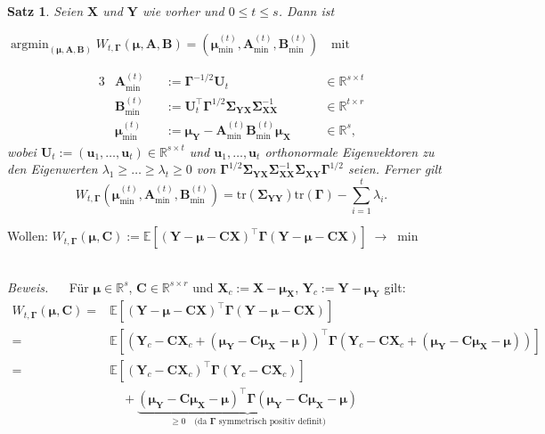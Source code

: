\documentclass[12pt, aspectratio=169]{beamer}
\newcommand{\E}{\mathbb{E}}
\newcommand{\R}{\mathbb{R}}
\newcommand{\X}{\mathbf{X}}
\newcommand{\Y}{\mathbf{Y}}
\newcommand{\muu}{\bm{\mu}}
\newcommand{\Ssigma}{\bm{\Sigma}}
\newcommand{\uu}{\mathbf{u}}
\newcommand{\C}{\mathbf{C}}
\newcommand{\A}{\mathbf{A}}
\newcommand{\B}{\mathbf{B}}
\newcommand{\Ggamma}{\bm{\Gamma}}
\newcommand{\tr}{\mathrm{tr}}
\DeclareMathOperator*{\argmin}{argmin}
\newtheorem{dtheorem}[ddefinition]{Satz}
\begin{document}
\begin{frame}
\begin{dtheorem}
	\label{thm:rrr}
	Seien $\X$ und $\Y$ wie vorher und $0 \leq t \leq s$. Dann ist
	\begin{center}
		$\argmin_{(\muu, \A, \B)} W_{t, \Ggamma}(\muu, \A, \B) = (\muu^{(t)}_{\min}, \A^{(t)}_{\min}, \B^{(t)}_{\min}) \quad  \text{mit}$
	\end{center}
	\begin{alignat*}{3}
	&\A^{(t)}_{\min}   &&:= \Ggamma^{-1/2} \mathbf{U}_t                                       &&\quad \in \R^{s \times t} \\
	&\B^{(t)}_{\min}   &&:= \mathbf{U}_t^\top \Ggamma^{1/2} \Ssigma_{\Y\X}\Ssigma_{\X\X}^{-1} &&\quad \in \R^{t \times r} \\
	&\muu^{(t)}_{\min} &&:= \muu_\Y - \A^{(t)}_{\min} \B^{(t)}_{\min} \muu_\X                 &&\quad \in \R^s \text{,}
	\end{alignat*}
	wobei $\mathbf{U}_t := (\uu_1,\dots, \uu_t) \in \R^{s \times t}$ und $\uu_1,\dots, \uu_t$ orthonormale Eigenvektoren zu den Eigenwerten $\lambda_1 \geq \dots \geq \lambda_t \geq 0$ von $\Ggamma^{1/2} \Ssigma_{\Y\X} \Ssigma_{\X\X}^{-1} \Ssigma_{\X\Y} \Ggamma^{1/2}$ seien.
	Ferner gilt
	$$W_{t, \Ggamma}(\muu^{(t)}_{\min}, \A^{(t)}_{\min}, \B^{(t)}_{\min}) = \tr(\Ssigma_{\Y\Y}) \tr(\Ggamma) - \sum_{i=1}^{t} \lambda_i \text{.}$$
\end{dtheorem}
\end{frame}

\begin{frame}
	\begin{alertblock}{}
		\begin{center}
			Wollen: $ W_{t, \Ggamma}(\muu, \C) := \E[(\Y - \muu - \C \X)^{\top} \Ggamma (\Y - \muu - \C \X)] \; \rightarrow \; \min$
		\end{center}
	\end{alertblock}
$\;$ \\
	\textit{Beweis.} $\quad$ 
	Für $\muu \in \R^s$, $\C \in \R^{s \times r}$ und $\X_c := \X - \muu_\X$, $\Y_c := \Y - \muu_\Y$ gilt: 
	\begin{align*}
	W_{t, \Ggamma}(\muu, \C) ={}& \E[(\Y - \muu - \C \X)^\top \Ggamma (\Y - \muu - \C \X)] \\
	={}& \E[(\Y_c - \C \X_c + (\muu_\Y - \C \muu_\X - \muu))^\top \Ggamma (\Y_c - \C \X_c + (\muu_\Y - \C \muu_\X - \muu))] \\
	={}& \E[(\Y_c - \C \X_c)^\top \Ggamma (\Y_c - \C \X_c)] \\
	& \quad + \underbrace{(\muu_\Y - \C \muu_\X - \muu)^\top \Ggamma (\muu_\Y - \C \muu_\X - \muu)}_{\geq 0 \quad \text{(da } \Ggamma \text{ symmetrisch positiv definit)}}
	\end{align*}
\end{frame}
\end{document}
